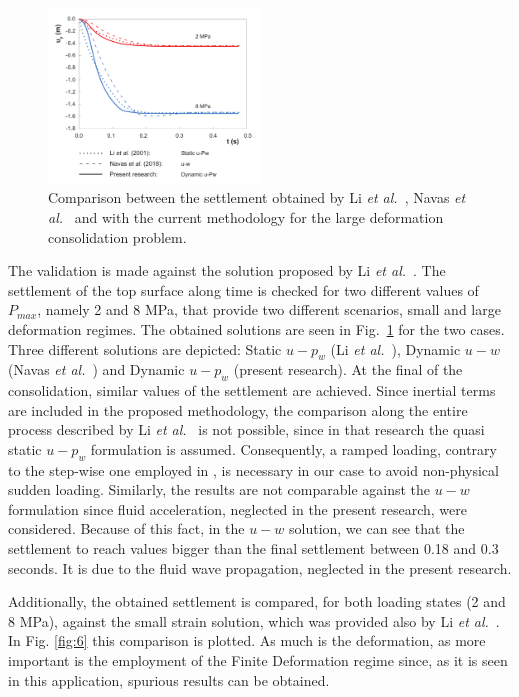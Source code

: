 \documentclass[twocolumn]{svjour3}          %
\begin{document}
\begin{figure}
  \includegraphics[width=0.5\textwidth]{Fig/borja.pdf}
\caption{Comparison between the settlement obtained by Li \textit{et al.}~\cite{LiBorja2004}, Navas \textit{et al.}~\cite{Navas2018a} and with the current methodology for the large deformation consolidation problem.}
\label{fig:5}      
\end{figure}
The validation is made against the solution proposed by Li \textit{et al.}~\cite{LiBorja2004}. The settlement of the top surface along time is checked for two different values of $P_{max}$, namely 2 and 8 MPa, that provide two different scenarios, small and large deformation regimes. The obtained solutions are seen in Fig.~\ref{fig:5} for the two cases. Three different solutions are depicted: Static $u-p_w$ (Li \textit{et al.}~\cite{LiBorja2004}), Dynamic $u-w$ (Navas \textit{et al.}~\cite{Navas:17b}) and Dynamic $u-p_w$ (present research). At the final of the consolidation, similar values of the settlement are achieved. Since inertial terms are included in the proposed methodology, the comparison along the entire process described by Li \textit{et al.}~\cite{LiBorja2004} is not possible, since in that research the quasi static $u-p_w$ formulation is assumed. Consequently, a ramped loading, contrary to the step-wise one employed in \cite{LiBorja2004}, is necessary in our case  to avoid non-physical sudden loading. Similarly, the results are not comparable against the $u-w$ formulation since fluid acceleration, neglected in the present research, were considered. Because of this fact, in the $u-w$ solution, we can see that the settlement to reach values bigger than the final settlement between 0.18 and 0.3 seconds. It is due to the fluid wave propagation, neglected in the present research.

Additionally, the obtained settlement is compared, for both loading states (2 and 8 MPa),  against the small strain solution, which was provided also by Li \textit{et al.}~\cite{LiBorja2004}. In Fig. \ref{fig:6} this comparison is plotted. As much is the deformation, as more important is the employment of the Finite Deformation regime since, as it is seen in this application, spurious results can be obtained.
\end{document}
